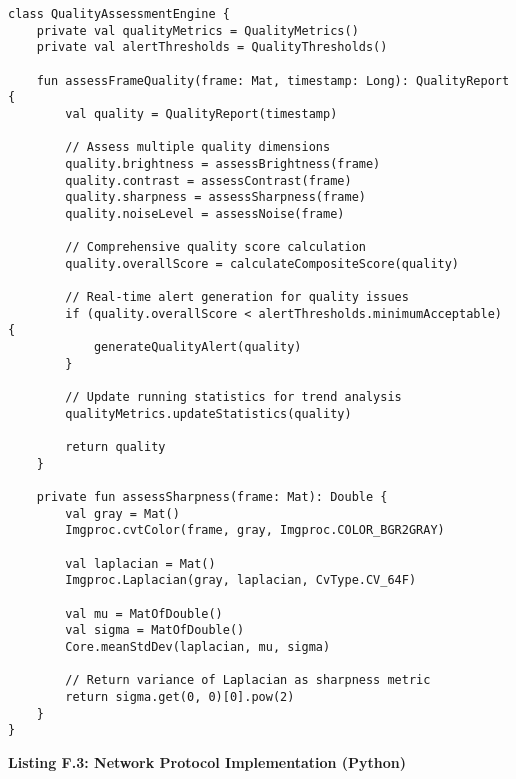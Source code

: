 \documentclass[12pt,a4paper]{report}
\begin{document}
\begin{verbatim}
class QualityAssessmentEngine {
    private val qualityMetrics = QualityMetrics()
    private val alertThresholds = QualityThresholds()
    
    fun assessFrameQuality(frame: Mat, timestamp: Long): QualityReport {
        val quality = QualityReport(timestamp)
        
        // Assess multiple quality dimensions
        quality.brightness = assessBrightness(frame)
        quality.contrast = assessContrast(frame)
        quality.sharpness = assessSharpness(frame)
        quality.noiseLevel = assessNoise(frame)
        
        // Comprehensive quality score calculation
        quality.overallScore = calculateCompositeScore(quality)
        
        // Real-time alert generation for quality issues
        if (quality.overallScore < alertThresholds.minimumAcceptable) {
            generateQualityAlert(quality)
        }
        
        // Update running statistics for trend analysis
        qualityMetrics.updateStatistics(quality)
        
        return quality
    }
    
    private fun assessSharpness(frame: Mat): Double {
        val gray = Mat()
        Imgproc.cvtColor(frame, gray, Imgproc.COLOR_BGR2GRAY)
        
        val laplacian = Mat()
        Imgproc.Laplacian(gray, laplacian, CvType.CV_64F)
        
        val mu = MatOfDouble()
        val sigma = MatOfDouble()
        Core.meanStdDev(laplacian, mu, sigma)
        
        // Return variance of Laplacian as sharpness metric
        return sigma.get(0, 0)[0].pow(2)
    }
}
\end{verbatim}

\textbf{Listing F.3: Network Protocol Implementation (Python)}
\end{document}
